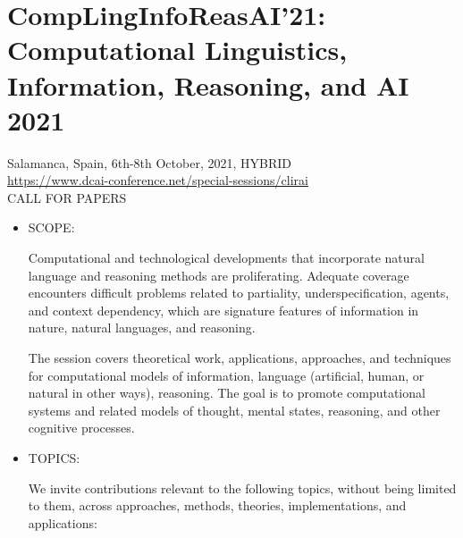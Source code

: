 \documentclass[prodmode,acmtecs]{acmsmall} %
\begin{document}
\section{CompLingInfoReasAI'21: Computational Linguistics, Information, Reasoning, and AI 2021}\label{CompLingInfoReasAI21}  Salamanca, Spain, 6th-8th October, 2021, HYBRID  \\ 
  \href{https://www.dcai-conference.net/special-sessions/clirai}{https://www.dcai-conference.net/special-sessions/clirai}\\ 
CALL FOR PAPERS 

\begin{itemize}\item  SCOPE: 
 
  Computational and technological developments that incorporate natural language and reasoning methods are proliferating. Adequate coverage encounters difficult problems related to partiality, underspecification, agents, and context dependency, which are signature features of information in nature, natural languages, and reasoning. 
 
  The session covers theoretical work, applications, approaches, and techniques for computational models of information, language (artificial, human, or natural in other ways), reasoning. The goal is to promote computational systems and related models of thought, mental states, reasoning, and other cognitive processes. 
 
\item  TOPICS: 
 
  We invite contributions relevant to the following topics, without being limited to them, across approaches, methods, theories, implementations, and applications: 
 

\end{itemize}
\end{document}
